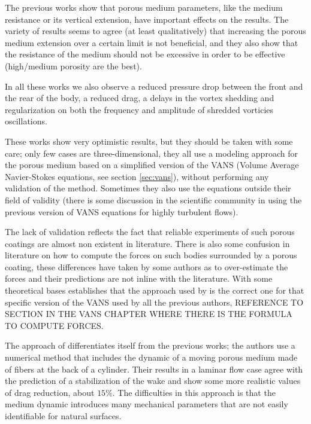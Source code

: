 The previous works show that porous medium parameters, like the medium resistance or its vertical extension, have important effects on the results.
The variety of results seems to agree (at least qualitatively) that increasing the porous medium extension over a certain limit is not beneficial, and they also show that the resistance of the medium should not be excessive in order to be effective (high/medium porosity are the best).

In all these works we also observe a reduced pressure drop between the front and the rear of the body, a reduced drag, a delays in the vortex shedding and regularization on both the frequency and amplitude of shredded vorticies oscillations.

These works show very optimistic results, but they should be taken with some care; only few cases are three-dimensional, they all use a modeling approach for the porous medium based on a simplified version of the VANS (Volume Average Navier-Stokes equations, see section \ref{sec:vans}), without performing any validation of the method.
Sometimes they also use the equations outside their field of validity (there is some discussion in the scientific community in using the previous version of VANS equations for highly turbulent flows).

The lack of validation reflects the fact that reliable experiments of such porous coatings are almost non existent in literature.
There is also some confusion in literature on how to compute the forces on such bodies surrounded by a porous coating, these differences have taken by some authors as \citet{naito2012numerical} to over-estimate the forces and their predictions are not inline with the literature.
With some theoretical bases \citet{caltagirone1994interaction} establishes that the approach used by \citet{bruneau2004passive} is the correct one for that specific version of the VANS used by all the previous authors, REFERENCE TO SECTION IN THE VANS CHAPTER WHERE THERE IS THE FORMULA TO COMPUTE FORCES.

The approach of \citet{favier2009passive} differentiates itself from the previous works; the authors use a numerical method that includes the dynamic of a moving porous medium made of fibers at the back of a cylinder.
Their results in a laminar flow case agree with the prediction of a stabilization of the wake and show some more realistic values of drag reduction, about $15\%$.
The difficulties in this approach is that the medium dynamic introduces many mechanical parameters that are not easily identifiable for natural surfaces.


